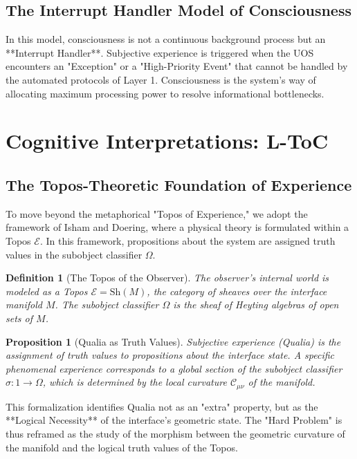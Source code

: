 \documentclass[11pt,titlepage]{article}
\newcommand{\curvature}{\mathcal{C}}
\newcommand{\topos}{\mathcal{E}}
\newcommand{\classifier}{\Omega}
\newtheorem{proposition}{Proposition}[section]
\newtheorem{definition}{Definition}[section]
\begin{document}
\subsection{The Interrupt Handler Model of Consciousness}
In this model, consciousness is not a continuous background process but an **Interrupt Handler**. Subjective experience is triggered when the UOS encounters an "Exception" or a "High-Priority Event" that cannot be handled by the automated protocols of Layer 1. Consciousness is the system's way of allocating maximum processing power to resolve informational bottlenecks.


\section{Cognitive Interpretations: L-ToC}
\subsection{The Topos-Theoretic Foundation of Experience}
To move beyond the metaphorical "Topos of Experience," we adopt the framework of Isham and Doering, where a physical theory is formulated within a Topos $\topos$. In this framework, propositions about the system are assigned truth values in the subobject classifier $\classifier$.

\begin{definition}[The Topos of the Observer]
The observer's internal world is modeled as a Topos $\topos = \text{Sh}(M)$, the category of sheaves over the interface manifold $M$. The subobject classifier $\classifier$ is the sheaf of Heyting algebras of open sets of $M$.
\end{definition}

\begin{proposition}[Qualia as Truth Values]
Subjective experience (Qualia) is the assignment of truth values to propositions about the interface state. A specific phenomenal experience corresponds to a global section of the subobject classifier $\sigma: 1 \to \classifier$, which is determined by the local curvature $\curvature_{\mu\nu}$ of the manifold.
\end{proposition}

This formalization identifies Qualia not as an "extra" property, but as the **Logical Necessity** of the interface's geometric state. The "Hard Problem" is thus reframed as the study of the morphism between the geometric curvature of the manifold and the logical truth values of the Topos.
\end{document}
